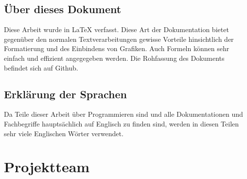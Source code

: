 \subsection*{Über dieses Dokument}
\label{sec:ueber-dokument}
Diese Arbeit wurde in \LaTeX{} verfasst. Diese Art der Dokumentation bietet gegenüber den normalen Textverarbeitungen gewisse Vorteile hinsichtlich der Formatierung und des Einbindens von Grafiken. Auch Formeln können sehr einfach und effizient angegegeben werden. Die Rohfassung des Dokuments befindet sich auf Github.

\subsection*{Erklärung der Sprachen}
\label{sec:sprachen-erklaerung}
Da Teile dieser Arbeit über Programmieren sind und alle Dokumentationen und Fachbegriffe hauptsächlich auf Englisch zu finden sind, werden in diesen Teilen sehr viele Englischen Wörter verwendet.

\clearpage

\newpage
\thispagestyle{empty}
\mbox{}

\clearpage

\section*{Projektteam}
\label{sec:projektteam}

